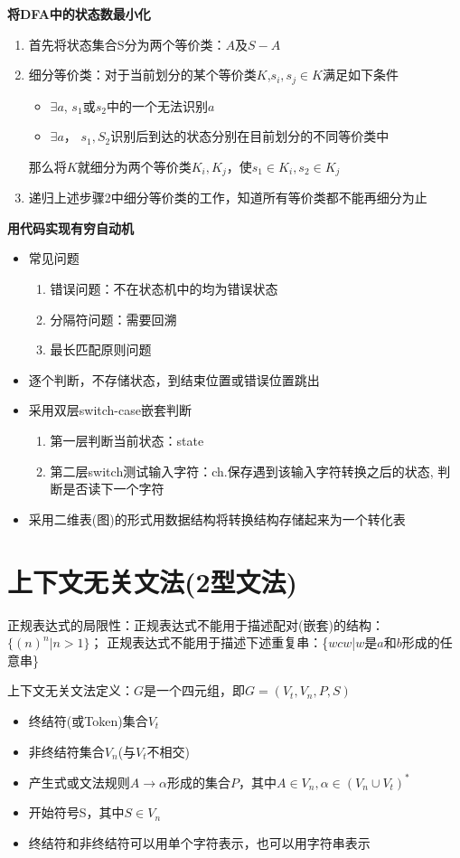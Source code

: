 \documentclass[utf8]{ctexart}
\begin{document}
\noindent \textbf{将DFA中的状态数最小化}
\begin{enumerate}
    \item 首先将状态集合S分为两个等价类：$A$及$S-A$
    \item 细分等价类：对于当前划分的某个等价类$K$,$s_{i},s_{j} \in K$满足如下条件
    \begin{itemize}
        \item $\exists a$, $s_1$或$s_2$中的一个无法识别$a$
        \item $\exists a$， $s_1,S_2$识别后到达的状态分别在目前划分的不同等价类中
    \end{itemize}
    那么将$K$就细分为两个等价类$K_i, K_j$，使$s_1 \in K_i, s_2 \in K_j$
    \item 递归上述步骤2中细分等价类的工作，知道所有等价类都不能再细分为止
\end{enumerate}

\noindent \textbf{用代码实现有穷自动机}
\begin{itemize}
\item 常见问题
\begin{enumerate}
    \item 错误问题：不在状态机中的均为错误状态
    \item 分隔符问题：需要回溯
    \item 最长匹配原则问题
\end{enumerate}
\item 逐个判断，不存储状态，到结束位置或错误位置跳出
\item 采用双层switch-case嵌套判断
\begin{enumerate}
    \item 第一层判断当前状态：state
    \item 第二层switch测试输入字符：ch.保存遇到该输入字符转换之后的状态,
    判断是否读下一个字符 
\end{enumerate}


\item 采用二维表(图)的形式用数据结构将转换结构存储起来为一个转化表
\end{itemize}

\section{上下文无关文法(2型文法)}

正规表达式的局限性：正规表达式不能用于描述配对(嵌套)的结构：$\{(n)^n | n > 1\}$；
正规表达式不能用于描述下述重复串：\{$wcw$|$w$是$a$和$b$形成的任意串\}

\noindent 上下文无关文法定义：$G$是一个四元组，即$G=(V_t, V_n, P, S)$
\begin{itemize}
    \item 终结符(或Token)集合$V_t$
    \item 非终结符集合$V_n$(与$V_t$不相交)
    \item 产生式或文法规则$A \rightarrow \alpha$形成的集合$P$，其中$A \in V_{n},\alpha \in {(V_{n} \cup V_{t})}^*$
    \item 开始符号S，其中$S \in V_n$
    \item 终结符和非终结符可以用单个字符表示，也可以用字符串表示
\end{itemize}
\end{document}
